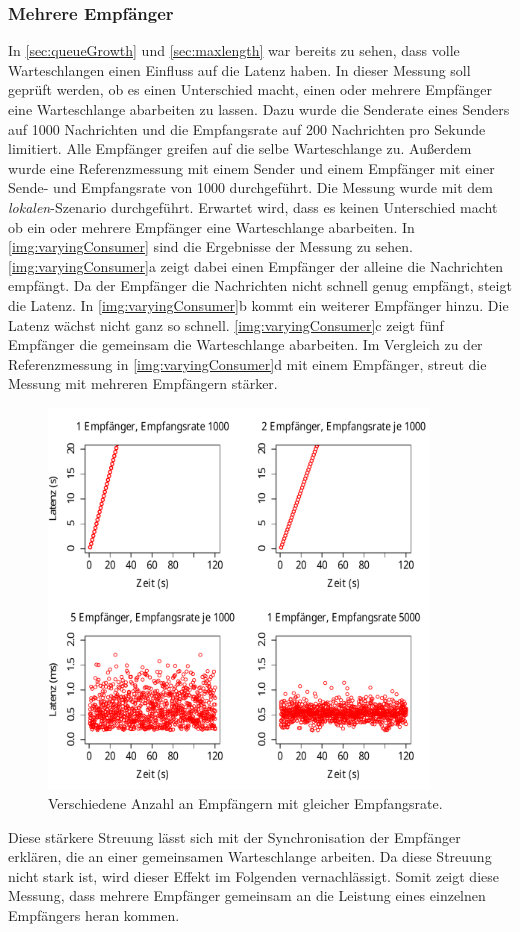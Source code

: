 \subsubsection{Mehrere Empfänger}
\label{sec:varyingConsumer}
In \autoref{sec:queueGrowth} und \autoref{sec:maxlength} war bereits zu sehen, dass volle Warteschlangen einen Einfluss auf die Latenz haben. In dieser Messung soll geprüft werden, ob es einen Unterschied macht, einen oder mehrere Empfänger eine Warteschlange abarbeiten zu lassen. Dazu wurde die Senderate eines Senders auf 1000 Nachrichten und die Empfangsrate auf 200 Nachrichten pro Sekunde limitiert. Alle Empfänger greifen auf die selbe Warteschlange zu. Außerdem wurde eine Referenzmessung mit einem Sender und einem Empfänger mit einer Sende- und Empfangsrate von 1000 durchgeführt. Die Messung wurde mit dem \textit{lokalen}-Szenario durchgeführt. Erwartet wird, dass es keinen Unterschied macht ob ein oder mehrere Empfänger eine Warteschlange abarbeiten.
In \autoref{img:varyingConsumer} sind die Ergebnisse der Messung zu sehen. \autoref{img:varyingConsumer}a zeigt dabei einen Empfänger der alleine die Nachrichten empfängt. Da der Empfänger die Nachrichten nicht schnell genug empfängt, steigt die Latenz. In \autoref{img:varyingConsumer}b kommt ein weiterer Empfänger hinzu. Die Latenz wächst nicht ganz so schnell. \autoref{img:varyingConsumer}c zeigt fünf Empfänger die gemeinsam die Warteschlange abarbeiten. Im Vergleich zu der Referenzmessung in \autoref{img:varyingConsumer}d mit einem Empfänger, streut die Messung mit mehreren Empfängern stärker.
\begin{figure}
\center
  \includegraphics[width=0.9\textwidth]{images/measurement/varying-consumer.pdf}
  \caption{Verschiedene Anzahl an Empfängern mit gleicher Empfangsrate.}
  \label{img:varyingConsumer}
\end{figure}
Diese stärkere Streuung lässt sich mit der Synchronisation der Empfänger erklären, die an einer gemeinsamen Warteschlange arbeiten. Da diese Streuung nicht stark ist, wird dieser Effekt im Folgenden vernachlässigt. Somit zeigt diese Messung, dass mehrere Empfänger gemeinsam an die Leistung eines einzelnen Empfängers heran kommen. 

